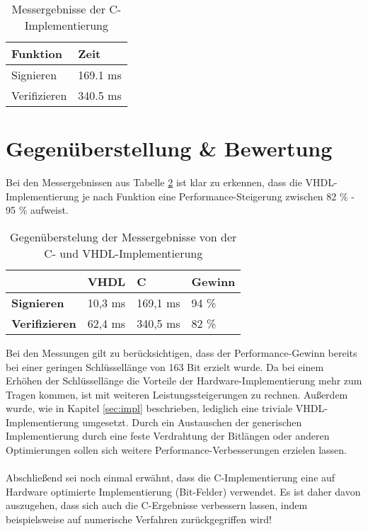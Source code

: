\begin{table}[h]
	\centering 
	\begin{tabular}{ | p{3cm} | p{6cm} | }
		\hline
		\textbf{Funktion} & \textbf{Zeit} \\
		\hline
		Signieren & 169.1 ms \\
		\hline
		Verifizieren & 340.5 ms \\
		\hline
	\end{tabular}
	\caption{Messergebnisse der C-Implementierung}
	\label{c-messung}
\end{table}

\section{Gegenüberstellung \& Bewertung}

Bei den Messergebnissen aus Tabelle \ref{messung-results} ist klar zu erkennen, dass die VHDL-Implementierung je nach Funktion eine Performance-Steigerung zwischen 82 \% - 95 \% aufweist. \\

\begin{table} [h]
	\centering 
	\begin{tabular}{ | p{3cm} | p{2cm} | p{2cm} | p{2cm} | }
		\hline
		 & \textbf{VHDL} & \textbf{C} & \textbf{Gewinn} \\
		\hline
		\textbf{Signieren} & 10,3 ms & 169,1 ms & 94 \% \\
		\hline
		\textbf{Verifizieren} &  62,4 ms & 340,5 ms & 82 \% \\
		\hline
	\end{tabular}
	\caption{Gegenüberstelung der Messergebnisse von der C- und VHDL-Implementierung}
	\label{messung-results}
\end{table}

Bei den Messungen gilt zu berücksichtigen, dass der Performance-Gewinn bereits bei einer geringen Schlüssellänge von 163 Bit erzielt wurde. Da bei einem Erhöhen der Schlüssellänge die Vorteile der Hardware-Implementierung mehr zum Tragen kommen, ist mit weiteren Leistungssteigerungen zu rechnen. Außerdem wurde, wie in Kapitel \ref{sec:impl} beschrieben, lediglich eine triviale VHDL-Implementierung umgesetzt. Durch ein Austauschen der generischen Implementierung durch eine feste Verdrahtung der Bitlängen oder anderen Optimierungen sollen sich weitere Performance-Verbesserungen erzielen lassen.
\\ \\
Abschließend sei noch einmal erwähnt, dass die C-Implementierung eine auf Hardware optimierte Implementierung (Bit-Felder) verwendet. Es ist daher davon auszugehen, dass sich auch die C-Ergebnisse verbessern lassen, indem beispielsweise auf numerische Verfahren zurückgegriffen wird!  

